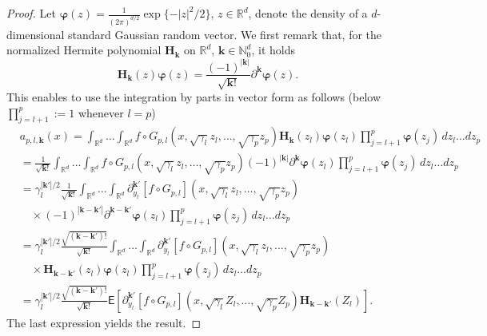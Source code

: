 \documentclass[article]{elsarticle}
\begin{document}
\begin{proof}
Let $\boldsymbol{\varphi}(z)=\frac{1}{(2\pi)^{d/2}} \exp\{-|z|^2/2\}$,
$z\in\mathbb R^d$, denote the density of a $d$-dimensional
standard Gaussian random vector.
We first remark that, for the normalized Hermite polynomial $\mathbf H_{\mathbf k}$ on $\mathbb R^d$,
$\mathbf k\in\mathbb N_0^d$, it holds
$$
\mathbf{H}_{\mathbf{k}}(z)\boldsymbol{\varphi}(z)
=\frac{(-1)^{|\mathbf{k}|}}{\sqrt{\mathbf{k} !}} \partial^{\mathbf{k}} \boldsymbol{\varphi}(z).
$$
This enables to use the integration by parts in vector form as follows
(below $\prod_{j=l+1}^p:=1$ whenever $l=p$)
\begin{align*}
&a_{p,l,\mathbf k}(x)
 =
\int_{\mathbb R^d}\ldots\int_{\mathbb R^d}
f\circ G_{p,l}(x,\sqrt{\gamma_{l}}z_{l},\ldots,\sqrt{\gamma_{p}}z_{p})
\mathbf{H}_{\mathbf{k}}(z_{l})\boldsymbol{\varphi}(z_l)
\prod_{j=l+1}^p\boldsymbol{\varphi}(z_j)\, dz_{l}\ldots dz_{p}
\\
& =
\frac{1}{\sqrt{\mathbf k!}}
\int_{\mathbb R^d}\ldots\int_{\mathbb R^d}
f\circ G_{p,l}(x,\sqrt{\gamma_{l}}z_{l},\ldots,\sqrt{\gamma_{p}}z_{p})
(-1)^{|\mathbf{k}|}\partial^{\mathbf{k}} \boldsymbol{\varphi}(z_l)
\prod_{j=l+1}^p\boldsymbol{\varphi}(z_j)\, dz_{l}\ldots dz_{p}
\\
& =
\gamma_l^{|\mathbf k'|/2}\frac{1}{\sqrt{\mathbf k!}}
\int_{\mathbb R^d}\ldots\int_{\mathbb R^d}
\partial_{y_l}^{\mathbf k'}[f\circ G_{p,l}](x,\sqrt{\gamma_{l}}z_{l},\ldots,\sqrt{\gamma_{p}}z_{p})
\\
&\hspace{1em}\times
(-1)^{|\mathbf{k}-\mathbf k'|}\partial^{\mathbf{k}-\mathbf k'} \boldsymbol{\varphi}(z_l)
\prod_{j=l+1}^p\boldsymbol{\varphi}(z_j)\, dz_{l}\ldots dz_{p}
\\
& =
\gamma_l^{|\mathbf k'|/2}\frac{\sqrt{(\mathbf k-\mathbf k')!}}{\sqrt{\mathbf k!}}
\int_{\mathbb R^d}\ldots\int_{\mathbb R^d}
\partial_{y_l}^{\mathbf k'}[f\circ G_{p,l}](x,\sqrt{\gamma_{l}}z_{l},\ldots,\sqrt{\gamma_{p}}z_{p})
\\
&\hspace{1em}\times
\mathbf{H}_{\mathbf{k}-\mathbf k'}(z_{l})\boldsymbol{\varphi}(z_l)
\prod_{j=l+1}^p\boldsymbol{\varphi}(z_j)\, dz_{l}\ldots dz_{p}
\\
 & =\gamma_{l}^{|\mathbf{k}'|/2}\frac{\sqrt{(\mathbf{k}-\mathbf{k}')!}}{\sqrt{\mathbf{k}!}}\mathsf{E}\left[\partial_{y_{l}}^{\mathbf{k}'}[f\circ G_{p,l}](x,\sqrt{\gamma_{l}}Z_{l},\ldots,\sqrt{\gamma_{p}}Z_{p})\mathbf{H}_{\mathbf{k}-\mathbf{k}'}(Z_{l})\right].
\end{align*}
The last expression yields the result.
\end{proof}
\end{document}
